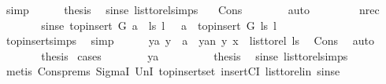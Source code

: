 \begin{isabellebody}
\ simp\isanewline
\ \ \ \ \isamarkupfalse%
\ {\isacharquery}{\kern0pt}thesis\ \isamarkupfalse%
\ sinse\ list{\isacharunderscore}{\kern0pt}to{\isacharunderscore}{\kern0pt}rel{\isachardot}{\kern0pt}simps\ \ \isamarkupfalse%
\ Cons\isanewline
\ \ \ \ \ \ \isamarkupfalse%
\ auto\isanewline
\ \ \isamarkupfalse%
\isanewline
\ \ \ \ \isamarkupfalse%
\ nrec\isanewline
\ \ \ \ \isamarkupfalse%
\ \isamarkupfalse%
\ sinse{\isacharcolon}{\kern0pt}\ {\isachardoublequoteopen}{\isacharparenleft}{\kern0pt}top{\isacharunderscore}{\kern0pt}insert\ G\ {\isacharparenleft}{\kern0pt}a\ {\isacharhash}{\kern0pt}\ ls{\isacharparenright}{\kern0pt}\ l{\isacharparenright}{\kern0pt}\ \ {\isacharequal}{\kern0pt}\ a\ {\isacharhash}{\kern0pt}\ top{\isacharunderscore}{\kern0pt}insert\ G\ ls\ l{\isachardoublequoteclose}\isanewline
\ \ \ \ \ \ \isamarkupfalse%
\ top{\isacharunderscore}{\kern0pt}insert{\isachardot}{\kern0pt}simps\ \isamarkupfalse%
\ simp\isanewline
\ \ \ \ \isamarkupfalse%
\ {\isacharparenleft}{\kern0pt}ya{\isacharparenright}{\kern0pt}\ {\isachardoublequoteopen}y\ {\isacharequal}{\kern0pt}\ a{\isachardoublequoteclose}\ {\isacharbar}{\kern0pt}\ {\isacharparenleft}{\kern0pt}yan{\isacharparenright}{\kern0pt}\ {\isachardoublequoteopen}{\isacharparenleft}{\kern0pt}y{\isacharcomma}{\kern0pt}\ x{\isacharparenright}{\kern0pt}\ {\isasymin}\ list{\isacharunderscore}{\kern0pt}to{\isacharunderscore}{\kern0pt}rel\ ls{\isachardoublequoteclose}\ \isamarkupfalse%
\ Cons\ \isamarkupfalse%
\ auto\isanewline
\ \ \ \ \isamarkupfalse%
\ \isamarkupfalse%
\ {\isacharquery}{\kern0pt}thesis\ \isamarkupfalse%
{\isacharparenleft}{\kern0pt}cases{\isacharparenright}{\kern0pt}\isanewline
\ \ \ \ \ \ \isamarkupfalse%
\ ya\isanewline
\ \ \ \ \ \ \isamarkupfalse%
\ \isamarkupfalse%
\ {\isacharquery}{\kern0pt}thesis\ \isamarkupfalse%
\ sinse\ list{\isacharunderscore}{\kern0pt}to{\isacharunderscore}{\kern0pt}rel{\isachardot}{\kern0pt}simps\isanewline
\ \ \ \ \ \ \ \ \isamarkupfalse%
\ {\isacharparenleft}{\kern0pt}metis\ Cons{\isachardot}{\kern0pt}prems\ SigmaI\ UnI{}\ top{\isacharunderscore}{\kern0pt}insert{\isacharunderscore}{\kern0pt}set\ insertCI\ list{\isacharunderscore}{\kern0pt}to{\isacharunderscore}{\kern0pt}rel{\isacharunderscore}{\kern0pt}in\ sinse{\isacharparenright}{\kern0pt}\ \isanewline

\end{isabellebody}
